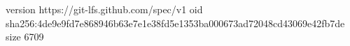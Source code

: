 version https://git-lfs.github.com/spec/v1
oid sha256:4de9e9fd7e868946b63e7e1e38fd5e1353ba000673ad72048cd43069e42fb7de
size 6709

